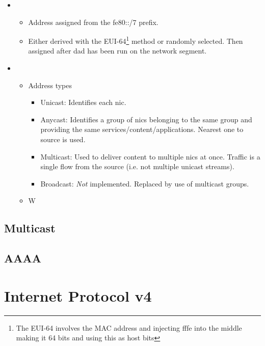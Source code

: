 \begin{itemize}
    \item {}
    \begin{itemize}
        \item Address assigned from the fe80::/7 prefix.
        \item Either derived with the EUI-64\footnote{The EUI-64 involves the MAC address and injecting fffe into the middle making it 64 bits and using this as host bits} method or randomly selected. Then assigned after \gls{dad} has been run on the network segment.
    \end{itemize}
    \item {}
    \begin{itemize}
        \item Address types
        \begin{itemize}
            \item Unicast: Identifies each \gls{nic}.
            \item Anycast: Identifies a group of \glspl{nic} belonging to the same group and providing the same services/content/applications. Nearest one to source is used.
            \item Multicast: Used to deliver content to multiple \glspl{nic} at once. Traffic is a single flow from the source (i.e. not multiple unicast streams).
            \item Broadcast: \textit{Not} implemented. Replaced by use of multicast groups.
        \end{itemize}
    \end{itemize}
    \begin{itemize}
        \item W
    \end{itemize}
\end{itemize}

\subsection{Multicast}

\subsection{AAAA}

\section[IPv4]{Internet Protocol v4}